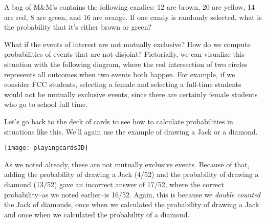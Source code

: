 \begin{try}
A bag of M\&M's contains the following candies:  12 are brown, 20 are yellow, 14 are red, 8 are green, and 16 are orange. If one candy is randomly selected, what is the probability that it's either brown or green? 
\end{try}

What if the events of interest are not mutually exclusive? How do we compute probabilities of events that are not disjoint? Pictorially, we can visualize this situation with the following diagram, where the red intersection of two circles represents all outcomes when two events both happen. For example, if we consider FCC students, selecting a female and selecting a full-time students would not be mutually exclusive events, since there are certainly female students who go to school full time.
\begin{center}
\end{center}

Let's go back to the deck of cards to see how to calculate probabilities in situations like this.  We'll again use the example of drawing a Jack or a diamond.
\vspace{0.1in}

\begin{center}
\texttt{[image: playingcardsJD]}
\end{center}
\vspace{0.1in}

As we noted already, these are not mutually exclusive events.  Because of that, adding the probability of drawing a Jack (4/52) and the probability of drawing a diamond (13/52) gave an incorrect answer of 17/52, where the correct probability--as we noted earlier--is 16/52.  Again, this is because we \textit{double counted} the Jack of diamonds, once when we calculated the probability of drawing a Jack and once when we calculated the probability of a diamond.

